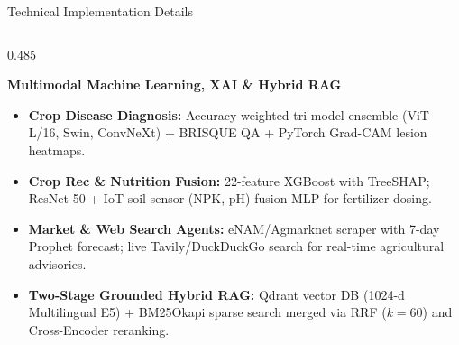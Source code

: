 \documentclass[aspectratio=169, 10pt]{beamer}
\begin{document}
\begin{frame}{Technical Implementation Details}
\begin{columns}[T,onlytextwidth]
        \begin{column}{0.485\textwidth}
            \begin{block}{\footnotesize \textbf{Multimodal Machine Learning, XAI \& Hybrid RAG}}
                \scriptsize
                \begin{itemize}\setlength{\itemsep}{2pt}\setlength{\parskip}{0pt}
                    \item \textbf{Crop Disease Diagnosis:} Accuracy-weighted tri-model ensemble (ViT-L/16, Swin, ConvNeXt) + BRISQUE QA + PyTorch Grad-CAM lesion heatmaps.
                    \item \textbf{Crop Rec \& Nutrition Fusion:} 22-feature XGBoost with TreeSHAP; ResNet-50 + IoT soil sensor (NPK, pH) fusion MLP for fertilizer dosing.
                    \item \textbf{Market \& Web Search Agents:} eNAM/Agmarknet scraper with 7-day Prophet forecast; live Tavily/DuckDuckGo search for real-time agricultural advisories.
                    \item \textbf{Two-Stage Grounded Hybrid RAG:} Qdrant vector DB (1024-d Multilingual E5) + BM25Okapi sparse search merged via RRF ($k=60$) and Cross-Encoder reranking.
                \end{itemize}
            \end{block}
        \end{column}
    \end{columns}
\end{frame}
\end{document}
